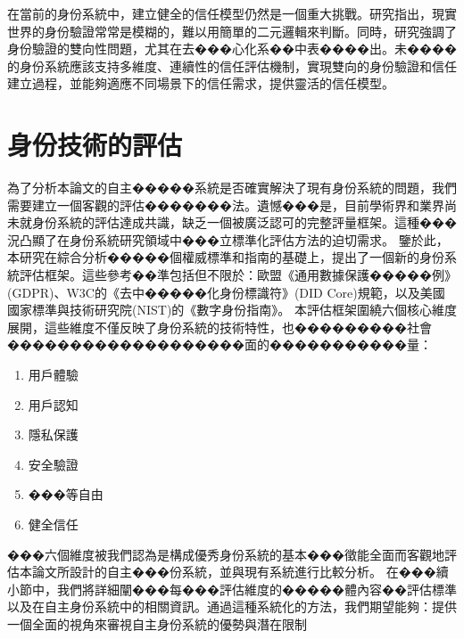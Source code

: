 在當前的身份系統中，建立健全的信任模型仍然是一個重大挑戰。研究\cite{s22155641}指出，現實世界的身份驗證常常是模糊的，難以用簡單的二元邏輯來判斷。同時，研究\cite{4489846}強調了身份驗證的雙向性問題，尤其在去���心化系��中表����出。未����的身份系統應該支持多維度、連續性的信任評估機制，實現雙向的身份驗證和信任建立過程，並能夠適應不同場景下的信任需求，提供靈活的信任模型。
\section{身份技術的評估}
為了分析本論文的自主�����系統是否確實解決了現有身份系統的問題，我們需要建立一個客觀的評估�������法。遺憾���是，目前學術界和業界尚未就身份系統的評估達成共識，缺乏一個被廣泛認可的完整評量框架。這種���況凸顯了在身份系統研究領域中���立標準化評估方法的迫切需求。\newline
鑒於此，本研究在綜合分析�����個權威標準和指南的基礎上，提出了一個新的身份系統評估框架。這些參考��準包括但不限於：歐盟《通用數據保護�����例》(GDPR)\cite{GDPR2016}、W3C的《去中�����化身份標識符》(DID Core)規範\cite{DIDCore}，以及美國國家標準與技術研究院(NIST)的《數字身份指南》\cite{NIST800-63-3}。\newline
本評估框架圍繞六個核心維度展開，這些維度不僅反映了身份系統的技術特性，也���������社會�������������������面的�����������量：
\begin{enumerate}
  \item 用戶體驗
  \item 用戶認知
  \item 隱私保護
  \item 安全驗證
  \item ���等自由
  \item 健全信任
\end{enumerate}
���六個維度被我們認為是構成優秀身份系統的基本���徵能全面而客觀地評估本論文所設計的自主���份系統，並與現有系統進行比較分析。\newline
在���續小節中，我們將詳細闡���每���評估維度的�����體內容��評估標準以及在自主身份系統中的相關資訊。通過這種系統化的方法，我們期望能夠：提供一個全面的視角來審視自主身份系統的優勢與潛在限制
